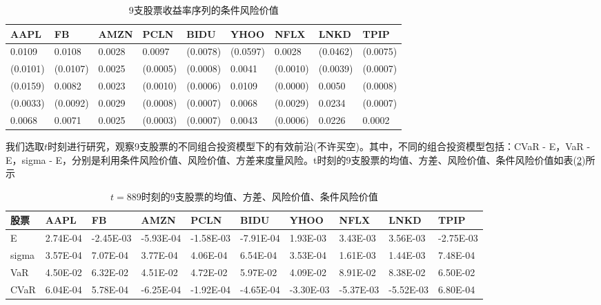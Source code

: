        \begin{table}[H]
        \footnotesize
        \caption{9支股票收益率序列的条件风险价值}
        \label{9支股票收益率序列的条件风险价值}
        \centering
        \begin{tabular}{lllllllll}
            \toprule
        AAPL      &   FB       &  AMZN   & PCLN     & BIDU     & YHOO     & NFLX     & LNKD     & TPIP\\
                    \midrule
        0.0109    &   0.0108   &  0.0028 & 0.0097   & (0.0078) & (0.0597) & 0.0028   & (0.0462) & (0.0075)\\
        (0.0101)  &   (0.0107) &  0.0025 & (0.0005) & (0.0008) & 0.0041   & (0.0010) & (0.0039) & (0.0007)\\
        (0.0159)  &   0.0082   &  0.0023 & (0.0010) & (0.0006) & 0.0109   & (0.0000) & 0.0050   & (0.0008)\\
        (0.0033)  &   (0.0092) &  0.0029 & (0.0008) & (0.0007) & 0.0068   & (0.0029) & 0.0234   & (0.0007)\\
        0.0068    &   0.0071   &  0.0025 & (0.0003) & (0.0007) & 0.0043   & (0.0006) & 0.0226   &  0.0002 \\
            \bottomrule
        \end{tabular}
        \end{table}
        \par
        我们选取$t$时刻进行研究，观察9支股票的不同组合投资模型下的有效前沿(不许买空)。其中，不同的组合投资模型包括：CVaR - E，VaR - E，sigma - E，分别是利用条件风险价值、风险价值、方差来度量风险。t时刻的9支股票的均值、方差、风险价值、条件风险价值如表(\ref{（t=889）时刻的9支股票的均值、方差、风险价值、条件风险价值})所示
        \begin{table}[H]
        \footnotesize
        \caption{$t=889$时刻的9支股票的均值、方差、风险价值、条件风险价值}
        \label{（t=889）时刻的9支股票的均值、方差、风险价值、条件风险价值}
        \centering
        \begin{tabular}{l|lllllllll}
            \toprule
        股票 & AAPL &   FB & AMZN  &  PCLN  &  BIDU  &  YHOO  &  NFLX  &  LNKD  &  TPIP\\
            \midrule
        E    &2.74E-04  &-2.45E-03& -5.93E-04 &-1.58E-03& -7.91E-04& 1.93E-03 & 3.43E-03 & 3.56E-03 &-2.75E-03\\
        sigma&3.57E-04  &7.07E-04 & 3.77E-04  &4.06E-04 & 6.54E-04 & 3.53E-04 & 1.61E-03 & 1.44E-03 & 7.48E-04\\
        VaR  &4.50E-02  &6.32E-02 & 4.51E-02  &4.72E-02 & 5.97E-02 & 4.09E-02 & 8.91E-02 & 8.38E-02 & 6.50E-02\\
        CVaR &6.04E-04  &5.78E-04 & -6.25E-04 &-1.92E-04& -4.65E-04& -3.30E-03& -5.37E-03& -5.52E-03& 6.80E-04\\
            \bottomrule
        \end{tabular}
        \end{table}
